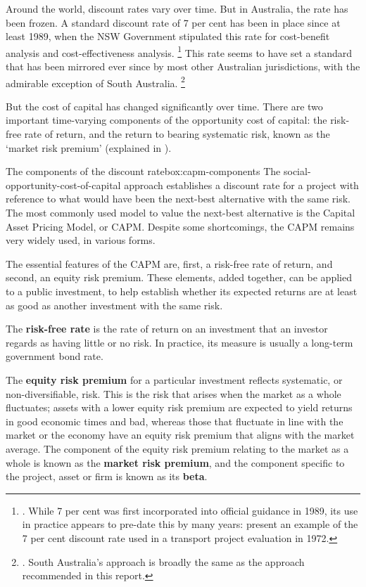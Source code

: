 \documentclass{grattan}
\begin{document}
Around the world, discount rates vary over time. But in Australia, the rate has been frozen. A standard discount rate of 7 per cent has been in place since at least 1989, when the NSW Government stipulated this rate for cost-benefit analysis and cost-effectiveness analysis.%
    \footnote{\textcite[][6]{Douglas-and-Brooker-Review-of-Transport-Project-Appraisal-in-NSW}. While 7 per cent was first incorporated into official guidance in 1989, its use in practice appears to pre-date this by many years:  present an example of the 7 per cent discount rate used in a transport project evaluation in 1972.}
This rate seems to have set a standard that has been mirrored ever since by most other Australian jurisdictions, with the admirable exception of South Australia.%
    \footnote{\textcite{South-Australia-Treasury-2014-Economic-Evaluation-Guidelines}. South Australia's approach is broadly the same as the approach recommended in this report.}

But the cost of capital has changed significantly over time. There are two important time-varying components of the opportunity cost of capital: the risk-free rate of return, and the return to bearing systematic risk, known as the `market risk premium' (explained in ). 

\begin{smallbox}{The components of the discount rate}{box:capm-components}
The social-opportunity-cost-of-capital approach establishes a discount rate for a project with reference to what would have been the next-best alternative with the same risk. The most commonly used model to value the next-best alternative is the Capital Asset Pricing Model, or CAPM\@. Despite some shortcomings, the CAPM remains very widely used, in various forms. 

The essential features of the CAPM are, first, a risk-free rate of return, and second, an equity risk premium. These elements, added together, can be applied to a public investment, to help establish whether its expected returns are at least as good as another investment with the same risk.

The \textbf{risk-free rate} is the rate of return on an investment that an investor regards as having little or no risk. In practice, its measure is usually a long-term government bond rate.

The \textbf{equity risk premium} for a particular investment reflects systematic, or non-diversifiable, risk. This is the risk that arises when the market as a whole fluctuates; assets with a lower equity risk premium are expected to yield returns in good economic times and bad, whereas those that fluctuate in line with the market or the economy have an equity risk premium that aligns with the market average. The component of the equity risk premium relating to the market as a whole is known as the \textbf{market risk premium}, and the component specific to the project, asset or firm is known as its \textbf{beta}.


\end{smallbox}
\end{document}
